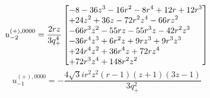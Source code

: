 \documentclass[11pt,a4paper]{article}
\begin{document}
\begin{equation}
u_{-2}^{(+),0000}=\frac{2 r z}{3 q_{+}^{4}}\left[\vcenter{\hbox{\shortstack[l]{$\displaystyle  - 8 - 36 z^{3} - 16 r^{2} - 8 r^{4} + 12 r + 12 r^{3}$\\
$\displaystyle  + 24 z^{2} + 36 z - 72 r^{2} z^{4} - 66 r z^{2}$\\
$\displaystyle  - 66 r^{3} z^{2} - 55 r z - 55 r^{3} z - 42 r^{2} z^{3}$\\
$\displaystyle  - 36 r^{4} z^{3} + 6 r^{2} z + 9 r z^{3} + 9 r^{3} z^{3}$\\
$\displaystyle  + 24 r^{4} z^{2} + 36 r^{4} z + 72 r z^{4}$\\
$\displaystyle  + 72 r^{3} z^{4} + 148 r^{2} z^{2}$}}}\right]
\label{eq:cat-auxiliary-plus-0000-m2}
\end{equation}
\begin{equation}
u_{-1}^{(+),0000}=- \frac{4 \sqrt{3} i r^{2} z^{2} \left(r - 1\right) \left(z + 1\right) \left(3 z - 1\right)}{3 q_{+}^{2}}
\label{eq:cat-auxiliary-plus-0000-m1}
\end{equation}
\end{document}
